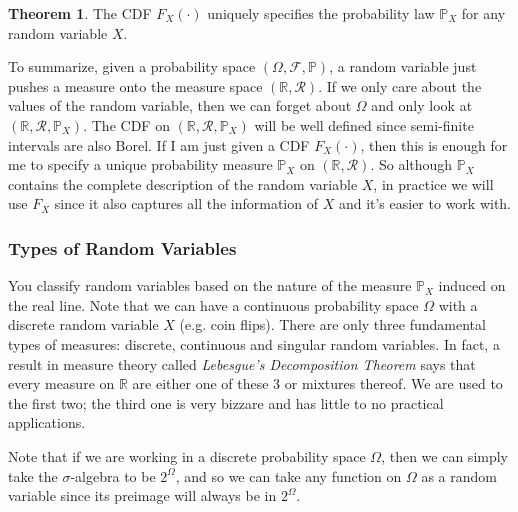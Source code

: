 \documentclass{article}
\theoremstyle{definition}
\newtheorem{theorem}{Theorem}[section]
\theoremstyle{remark}
\theoremstyle{definition}
\begin{document}
\begin{theorem}
The CDF $F_X (\cdot)$ uniquely specifies the probability law $\mathbb{P}_X$ for any random variable $X$. 
\end{theorem}

To summarize, given a probability space $(\Omega, \mathcal{F}, \mathbb{P})$, a random variable just pushes a measure onto the measure space $(\mathbb{R}, \mathcal{R})$. If we only care about the values of the random variable, then we can forget about $\Omega$ and only look at $(\mathbb{R}, \mathcal{R}, \mathbb{P}_X)$. The CDF on $(\mathbb{R}, \mathcal{R}, \mathbb{P}_X)$ will be well defined since semi-finite intervals are also Borel. If I am just given a CDF $F_X (\cdot)$, then this is enough for me to specify a unique probability measure $\mathbb{P}_X$ on $(\mathbb{R}, \mathcal{R})$. So although $\mathbb{P}_X$ contains the complete description of the random variable $X$, in practice we will use $F_X$ since it also captures all the information of $X$ and it's easier to work with. 

\subsubsection{Types of Random Variables}

You classify random variables based on the nature of the measure $\mathbb{P}_X$ induced on the real line. Note that we can have a continuous probability space $\Omega$ with a discrete random variable $X$ (e.g. coin flips). There are only three fundamental types of measures: discrete, continuous and singular random variables. In fact, a result in measure theory called \textit{Lebesgue's Decomposition Theorem} says that every measure on $\mathbb{R}$ are either one of these 3 or mixtures thereof. We are used to the first two; the third one is very bizzare and has little to no practical applications. 

Note that if we are working in a discrete probability space $\Omega$, then we can simply take the $\sigma$-algebra to be $2^\Omega$, and so we can take any function on $\Omega$ as a random variable since its preimage will always be in $2^\Omega$. 
\end{document}

